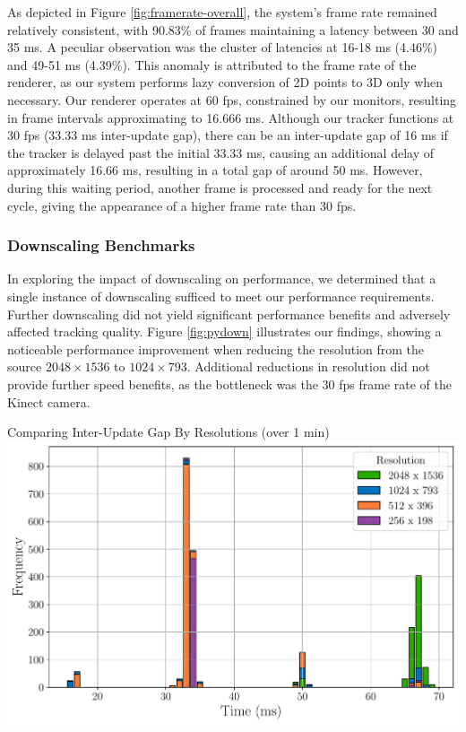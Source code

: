 As depicted in Figure \ref{fig:framerate-overall}, the system's frame rate remained relatively consistent, with 90.83\% of frames maintaining a latency between 30 and 35 ms. A peculiar observation was the cluster of latencies at 16-18 ms (4.46\%) and 49-51 ms (4.39\%). This anomaly is attributed to the frame rate of the renderer, as our system performs lazy conversion of 2D points to 3D only when necessary. Our renderer operates at 60 fps, constrained by our monitors, resulting in frame intervals approximating to 16.666 ms. Although our tracker functions at 30 fps (33.33 ms inter-update gap), there can be an inter-update gap of 16 ms if the tracker is delayed past the initial 33.33 ms, causing an additional delay of approximately 16.66 ms, resulting in a total gap of around 50 ms. However, during this waiting period, another frame is processed and ready for the next cycle, giving the appearance of a higher frame rate than 30 fps.

\subsubsection{Downscaling Benchmarks}

In exploring the impact of downscaling on performance, we determined that a single instance of downscaling sufficed to meet our performance requirements. Further downscaling did not yield significant performance benefits and adversely affected tracking quality. Figure \ref{fig:pydown} illustrates our findings, showing a noticeable performance improvement when reducing the resolution from the source $2048 \times 1536$ to $1024 \times 793$. Additional reductions in resolution did not provide further speed benefits, as the bottleneck was the 30 fps frame rate of the Kinect camera.

\begin{figureBox}[label={fig:pydown}, width=0.8\linewidth]{Comparing Inter-Update Gap By Resolutions (over 1 min)}
    \includegraphics[width = 1.0\linewidth]{./evaluation/figures/pydown.pdf}
\end{figureBox}

